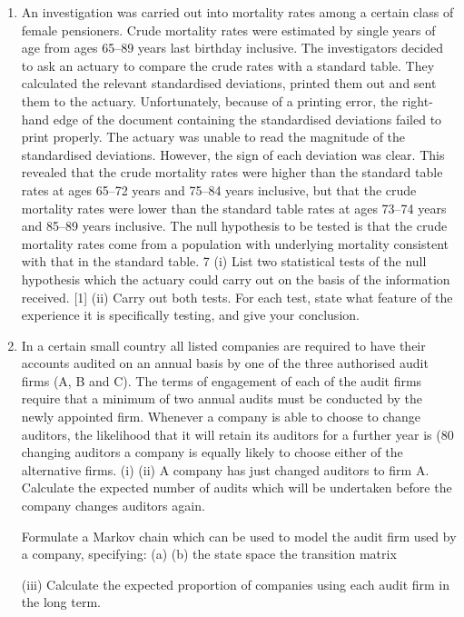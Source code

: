 \documentclass[a4paper,12pt]{article}
\begin{document}
\begin{enumerate}
\item An investigation was carried out into mortality rates among a certain class of female
pensioners. Crude mortality rates were estimated by single years of age from ages
65–89 years last birthday inclusive. The investigators decided to ask an actuary to
compare the crude rates with a standard table. They calculated the relevant
standardised deviations, printed them out and sent them to the actuary.
Unfortunately, because of a printing error, the right-hand edge of the document
containing the standardised deviations failed to print properly. The actuary was
unable to read the magnitude of the standardised deviations. However, the sign of
each deviation was clear. This revealed that the crude mortality rates were higher
than the standard table rates at ages 65–72 years and 75–84 years inclusive, but that
the crude mortality rates were lower than the standard table rates at ages 73–74 years
and 85–89 years inclusive.
The null hypothesis to be tested is that the crude mortality rates come from a
population with underlying mortality consistent with that in the standard table.
7
(i) List two statistical tests of the null hypothesis which the actuary could carry
out on the basis of the information received.
[1]
(ii) Carry out both tests. For each test, state what feature of the experience it is
specifically testing, and give your conclusion.

\item 
In a certain small country all listed companies are required to have their accounts
audited on an annual basis by one of the three authorised audit firms (A, B and C).
The terms of engagement of each of the audit firms require that a minimum of two
annual audits must be conducted by the newly appointed firm. Whenever a company
is able to choose to change auditors, the likelihood that it will retain its auditors for a
further year is (80%
changing auditors a company is equally likely to choose either of the alternative firms.
(i)
(ii)
A company has just changed auditors to firm A. Calculate the expected
number of audits which will be undertaken before the company changes
auditors again.

Formulate a Markov chain which can be used to model the audit firm used by
a company, specifying:
(a)
(b)
the state space
the transition matrix

(iii)
Calculate the expected proportion of companies using each audit firm in the
long term.
\end{enumerate}
\end{document}
